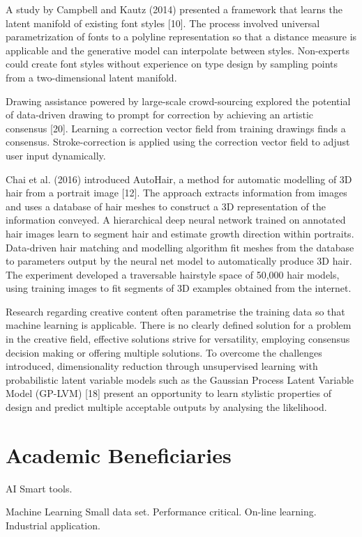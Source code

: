 \documentclass[a4paper, fontsize=15pt, onecolumn]{article} %
\numberwithin{equation}{section} %
\numberwithin{figure}{section} %
\numberwithin{table}{section} %
\begin{document}
A study by Campbell and Kautz (2014) presented a framework that learns the latent manifold of existing font styles [10]. The process involved universal parametrization of fonts to a polyline representation so that a distance measure is applicable and the generative model can interpolate between styles. Non-experts could create font styles without experience on type design by sampling points from a two-dimensional latent manifold.

Drawing assistance powered by large-scale crowd-sourcing explored the potential of data-driven drawing to prompt for correction by achieving an artistic consensus [20]. Learning a correction vector field from training drawings finds a consensus. Stroke-correction is applied using the correction vector field to adjust user input dynamically.

Chai et al. (2016) introduced AutoHair, a method for automatic modelling of 3D hair from a portrait image [12]. The approach extracts information from images and uses a database of hair meshes to construct a 3D representation of the information conveyed. A hierarchical deep neural network trained on annotated hair images learn to segment hair and estimate growth direction within portraits. Data-driven hair matching and modelling algorithm fit meshes from the database to parameters output by the neural net model to automatically produce 3D hair. The experiment developed a traversable hairstyle space of 50,000 hair models, using training images to fit segments of 3D examples obtained from the internet.

Research regarding creative content often parametrise the training data so that machine learning is applicable. There is no clearly defined solution for a problem in the creative field, effective solutions strive for versatility, employing consensus decision making or offering multiple solutions. To overcome the challenges introduced, dimensionality reduction through unsupervised learning with probabilistic latent variable models such as the Gaussian Process Latent Variable Model (GP-LVM) [18] present an opportunity to learn stylistic properties of design and predict multiple acceptable outputs by analysing the likelihood.

\section{Academic Beneficiaries}
AI
Smart tools.

Machine Learning
Small data set.
Performance critical.
On-line learning.
Industrial application.
\end{document}
